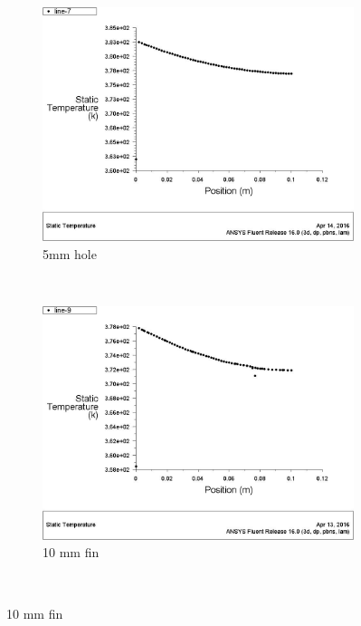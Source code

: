 \begin{figure}[h]
 	\begin{subfigure}[b]{0.5\textwidth}
 		\includegraphics[width=\textwidth]{127.jpg}
 		\caption{5mm hole}
 		\label{fig:structured}
 	\end{subfigure}%
 	~ %
 	\begin{subfigure}[b]{0.5\textwidth}
 		\includegraphics[width=\textwidth]{128.jpg}
 		\caption{10 mm fin}
 		\label{fig:unstructured}
 	\end{subfigure}
 	~ %

\end{figure}

